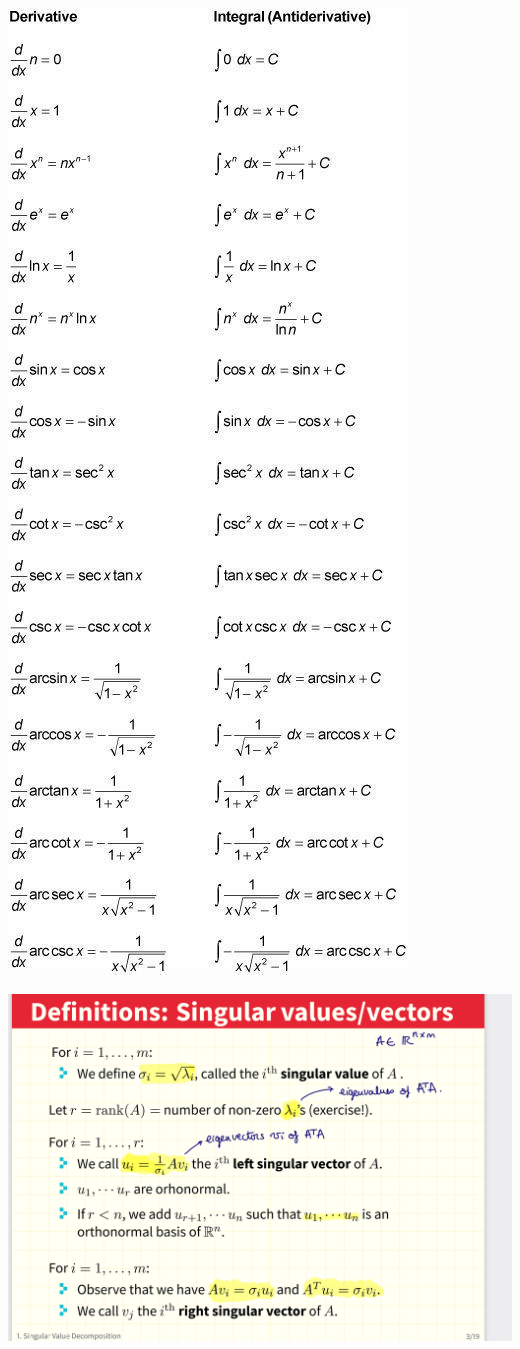 \documentclass[12pt,twoside]{article}
\begin{document}
\includegraphics[scale=.6]{diff rom.jpg}

\includegraphics[scale=.5]{singular vectors.png}
\end{document}
